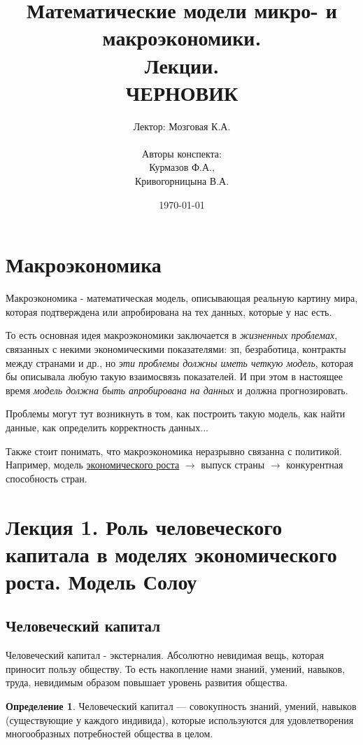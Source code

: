 \documentclass[reqno]{article}
\title{Математические модели микро- и макроэкономики.\\ Лекции.\\ ЧЕРНОВИК}
\author{Лектор: Мозговая К.А.\\ \\ Авторы конспекта: \\ Курмазов Ф.А.,\\Кривогорницына В.А.}
\date{\today}
\theoremstyle{definition}
\theoremstyle{definition}
\theoremstyle{definition}
\theoremstyle{definition}
\theoremstyle{definition}
\theoremstyle{definition}
\theoremstyle{definition}
\newtheorem*{defi}{Определение}
\theoremstyle{definition}
\theoremstyle{definition}
\begin{document}
	\setlength{\parindent}{0pt}
	\setlength{\parskip}{0.3em}

	\maketitle

	\tableofcontents
	\newpage

	\section*{Макроэкономика}
		Макроэкономика - математическая модель, описывающая реальную картину мира, которая подтверждена или апробирована на тех данных, которые у нас есть.
		
		То есть основная идея макроэкономики заключается в \emph{жизненных проблемах}, связанных с некими экономическими показателями: зп, безработица, контракты между странами и др., но \emph{эти проблемы должны иметь четкую модель}, которая бы описывала любую такую взаимосвязь показателей. И при этом в настоящее время \emph{модель должна быть апробирована на данных} и должна прогнозировать. \medskip
		
		Проблемы могут тут возникнуть в том, как построить такую модель, как найти данные, как определить корректность данных... 
		
		Также стоит понимать, что макроэкономика неразрывно связанна с политикой. Например, модель \hyperref[sec:1.2]{экономического роста} $\rightarrow$ выпуск страны $\rightarrow$ конкурентная способность стран.
		\newpage
	
	\section{Лекция 1. Роль человеческого капитала в моделях экономического роста. Модель Солоу}
		\subsection{Человеческий капитал}
			Человеческий капитал - экстерналия. Абсолютно невидимая вещь, которая приносит пользу обществу. То есть накопление нами знаний, умений, навыков, труда, невидимым образом повышает уровень развития общества.
			
			\begin{defi}
				Человеческий капитал — совокупность знаний, умений, навыков (существующие у каждого индивида), которые используются для удовлетворения многообразных потребностей общества в целом.
			\end{defi}
			
\end{document}
